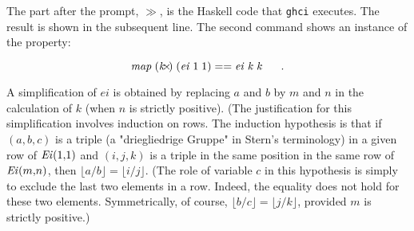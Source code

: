 \documentclass[leqno,fleqn,12pt]{article}
\newcommand{\Varid}[1]{\mathit{#1}}
\begin{document}
The part after the prompt, $\gg$, is the Haskell code that
\texttt{ghci} executes. The result is shown in the subsequent
line. The second command shows an instance of the property:

\[
\ensuremath{\Varid{map}\;(\Varid{k}\mskip-4mu\times\mskip-4mu)\;(\Varid{ei}\;\mathrm{1}\;\mathrm{1})==\Varid{ei}\;\Varid{k}\;\Varid{k}} ~~~~~.
\]


A simplification of \ensuremath{\Varid{ei}} is obtained by replacing
 \ensuremath{\Varid{a}} and \ensuremath{\Varid{b}} by \ensuremath{\Varid{m}} and \ensuremath{\Varid{n}} in the calculation of \ensuremath{\Varid{k}} (when 
\ensuremath{\Varid{n}} is strictly positive).  (The justification for this simplification
involves induction on rows.  The induction hypothesis is that if
\ensuremath{(\Varid{a},\Varid{b},\Varid{c})} is a triple (a "driegliedrige Gruppe" in Stern's
terminology) in a given row of $\mathit{Ei\/}(1{,}1)$ and \ensuremath{(\Varid{i},\Varid{j},\Varid{k})} is
a triple in the same position in the same row of
$\mathit{Ei\/}(m{,}n)$, then \ensuremath{\lfloor\Varid{a}/\Varid{b}\rfloor\mathrel{=}\lfloor\Varid{i}/\Varid{j}\rfloor}.  (The role
of variable \ensuremath{\Varid{c}} in this hypothesis is simply to exclude the last two
elements in a row.  Indeed, the equality does not hold for these two
elements. Symmetrically, of course, \ensuremath{\lfloor\Varid{b}/\Varid{c}\rfloor\mathrel{=}\lfloor\Varid{j}/\Varid{k}\rfloor}, provided
\ensuremath{\Varid{m}} is strictly positive.) 
\end{document}
